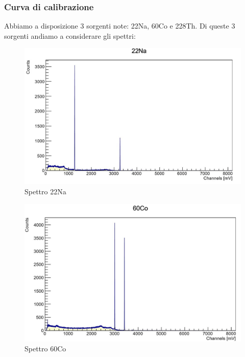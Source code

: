 \documentclass[a4paper,10pt]{article}
\begin{document}

\subsubsection{Curva di calibrazione}
Abbiamo a disposizione 3 sorgenti note: 22Na, 60Co e 228Th. Di queste 3 sorgenti andiamo a considerare gli spettri:

\begin{figure}[!h]
    \centering
    \includegraphics[scale=0.6]{grafici/sodiocompleto}
    \caption{Spettro 22Na}
\end{figure}
\newpage
\begin{figure}[!h]
    \centering
    \includegraphics[scale=0.6]{grafici/cobaltocompleto}
    \caption{Spettro 60Co}
\end{figure}
\end{document}
